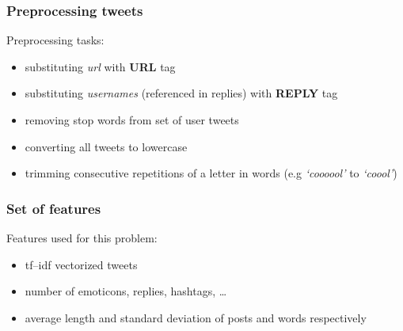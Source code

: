 \documentclass[utf8]{beamer}
\begin{document}
\begin{frame}
	\frametitle{Preprocessing tweets}
	Preprocessing tasks:
	\pause
	\begin{itemize}
		\item substituting \textit{url} with \textbf{URL} tag
		\item substituting \textit{usernames} (referenced in replies) with \textbf{REPLY} tag
		\item removing stop words from set of user tweets
		\item converting all tweets to lowercase
		\item trimming consecutive repetitions of a letter in words (e.g \textit{`coooool'} to \textit{`coool'})
	\end{itemize}
\end{frame}

\begin{frame}
	\frametitle{Set of features}
	Features used for this problem:
	\pause
	\begin{itemize}
		\item tf--idf vectorized tweets
		\item number of emoticons, replies, hashtags, \ldots
		\item average length and standard deviation of posts and words respectively
	\end{itemize}
\end{frame}
\end{document}
